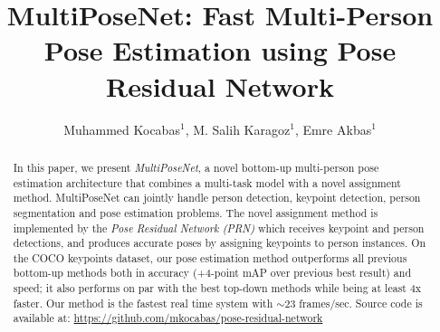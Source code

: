 \documentclass[runningheads]{llncs}
\begin{document}
\pagestyle{headings}
\mainmatter
\def\ECCV18SubNumber{757}  




\title{MultiPoseNet: Fast Multi-Person Pose Estimation using Pose Residual Network} 




\titlerunning{ }
\authorrunning{ }




\author{Muhammed Kocabas$^1$, M. Salih Karagoz$^1$, Emre Akbas$^1$}




\maketitle




\begin{abstract}
In this paper, we present \textit{MultiPoseNet}, a novel bottom-up multi-person pose estimation architecture that combines a multi-task model with a novel assignment method.  MultiPoseNet can jointly handle person detection, keypoint detection, person segmentation and pose estimation problems. The novel assignment method is implemented by the \textit{Pose Residual Network (PRN)} which receives keypoint and person detections, and produces accurate poses by assigning keypoints to person instances. On the COCO keypoints dataset, our pose estimation method outperforms all previous bottom-up methods both in accuracy (+4-point mAP over previous best result) and speed; it also performs on par with the best top-down methods while being at least 4x faster.  Our method is the fastest real time system with $\sim$23 frames/sec. Source code is available at: \url{https://github.com/mkocabas/pose-residual-network}





\end{abstract}
\end{document}
